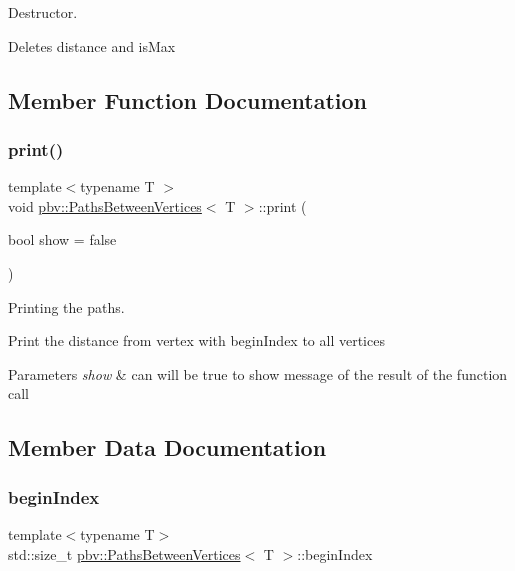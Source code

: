 Destructor. 

Deletes \textquotesingle{}distance\textquotesingle{} and \textquotesingle{}is\+Max\textquotesingle{} 

\subsection{Member Function Documentation}
\mbox{\label{structpbv_1_1_paths_between_vertices_aca6583521b4e35eec9db20c901f200e6}} 
\subsubsection{\texorpdfstring{print()}{print()}}
{\footnotesize\ttfamily template$<$typename T $>$ \\
void \mbox{\hyperlink{structpbv_1_1_paths_between_vertices}{pbv\+::\+Paths\+Between\+Vertices}}$<$ T $>$\+::print (\begin{DoxyParamCaption}\item[{bool}]{show = {\ttfamily false} }\end{DoxyParamCaption})}



Printing the paths. 

Print the distance from vertex with begin\+Index to all vertices 
\begin{DoxyParams}{Parameters}
{\em show} & can will be true to show message of the result of the function call \\
\hline
\end{DoxyParams}


\subsection{Member Data Documentation}
\mbox{\label{structpbv_1_1_paths_between_vertices_abf43c3771ed161bb80a73fe39e5cc916}} 
\subsubsection{\texorpdfstring{begin\+Index}{beginIndex}}
{\footnotesize\ttfamily template$<$typename T$>$ \\
std\+::size\+\_\+t \mbox{\hyperlink{structpbv_1_1_paths_between_vertices}{pbv\+::\+Paths\+Between\+Vertices}}$<$ T $>$\+::begin\+Index}

